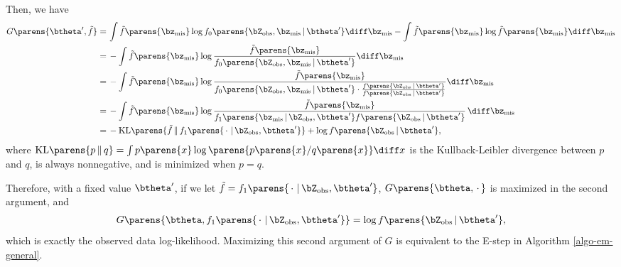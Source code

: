 \documentclass[12pt]{article}
\begin{document}
\begin{enumerate}[label=\textbf{\arabic*.}]
\begin{enumerate}
		Then, we have 
		\begin{align*}
			G \parens{\btheta', \tilde{f}} = & \, \int \tilde{f} \parens{\bz_{\mathrm{mis}}} \log f_0 \parens{\bZ_{\mathrm{obs}}, \bz_{\mathrm{mis}} \,\vert\, \btheta'} \diff \bz_{\mathrm{mis}} - \int \tilde{f} \parens{\bz_{\mathrm{mis}}} \log \tilde{f} \parens{\bz_{\mathrm{mis}}} \diff \bz_{\mathrm{mis}} \\ 
			= & \, - \int \tilde{f} \parens{\bz_{\mathrm{mis}}} \log \frac{\tilde{f} \parens{\bz_{\mathrm{mis}}}}{f_0 \parens{\bZ_{\mathrm{obs}}, \bz_{\mathrm{mis}} \,\vert\, \btheta'}} \diff \bz_{\mathrm{mis}} \\ 
			= & \, - \int \tilde{f} \parens{\bz_{\mathrm{mis}}} \log \frac{\tilde{f} \parens{\bz_{\mathrm{mis}}}}{f_0 \parens{\bZ_{\mathrm{obs}}, \bz_{\mathrm{mis}} \,\vert\, \btheta'} \cdot \frac{f \parens{\bZ_{\mathrm{obs}} \,\vert\, \btheta'}}{f \parens{\bZ_{\mathrm{obs}} \,\vert\, \btheta'}}} \diff \bz_{\mathrm{mis}}  \\ 
			= & \, - \int \tilde{f} \parens{\bz_{\mathrm{mis}}} \log \frac{\tilde{f} \parens{\bz_{\mathrm{mis}}}}{f_1 \parens{\bz_{\mathrm{mis}} \,\vert\, \bZ_{\mathrm{obs}}, \btheta'} f \parens{\bZ_{\mathrm{obs}} \,\vert\, \btheta'}} \, \diff \bz_{\mathrm{mis}}  \\ 
			= & \, - \mathrm{KL} \parens{\tilde{f} \,\Vert\, f_1 \parens{\,\cdot\, \,\vert\, \bZ_{\mathrm{obs}}, \btheta'}} + \log f \parens{\bZ_{\mathrm{obs}} \,\vert\, \btheta'}, 
		\end{align*}
		where $\mathrm{KL} \parens{p \,\Vert\, q} = \int p \parens{x} \log \parens{p \parens{x} / q \parens{x}} \diff x$ is the Kullback-Leibler divergence between $p$ and $q$, is always nonnegative, and is minimized when $p = q$. 
		
		Therefore, with a fixed value $\btheta'$, if we let $\tilde{f} = f_1 \parens{\,\cdot\, \,\vert\, \bZ_{\mathrm{obs}}, \btheta'}$, $G \parens{\btheta, \,\cdot\,}$ is maximized in the second argument, and 
		\begin{align*}
			G \parens{\btheta, f_1 \parens{\,\cdot\, \,\vert\, \bZ_{\mathrm{obs}}, \btheta'}} = \log f \parens{\bZ_{\mathrm{obs}} \,\vert\, \btheta'}, 
		\end{align*}
		which is exactly the observed data log-likelihood. Maximizing this second argument of $G$ is equivalent to the E-step in Algorithm \ref{algo-em-general}. 
		

\end{enumerate}
\end{enumerate}
\end{document}
